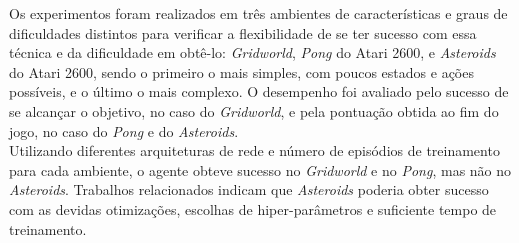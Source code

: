 Os experimentos foram realizados em três ambientes de características e graus de dificuldades distintos para verificar a flexibilidade de se ter sucesso com essa técnica e da dificuldade em obtê-lo: \textit{Gridworld}, \textit{Pong} do Atari 2600, e \textit{Asteroids} do Atari 2600, sendo o primeiro o mais simples, com poucos estados e ações possíveis, e o último o mais complexo.
O desempenho foi avaliado pelo sucesso de se alcançar o objetivo, no caso do \textit{Gridworld}, e pela pontuação obtida ao fim do jogo, no caso do \textit{Pong} e do \textit{Asteroids}.
\\

Utilizando diferentes arquiteturas de rede e número de episódios de treinamento para cada ambiente, o agente obteve sucesso no \textit{Gridworld} e no \textit{Pong}, mas não no \textit{Asteroids}.
Trabalhos relacionados indicam que \textit{Asteroids} poderia obter sucesso com as devidas otimizações, escolhas de hiper-parâmetros e suficiente tempo de treinamento.
\\







